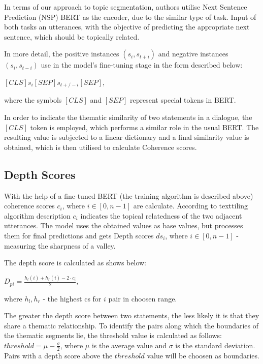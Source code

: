 \documentclass[PMI,VKR]{HSEUniversity}
\begin{document}
In terms of our approach to topic segmentation, authors utilise Next Sentence Prediction (NSP) BERT as the encoder, due to the similar type of task. 
Input of both tasks an utterances, with the objective of predicting the appropriate next sentence, which should be topically related. 

In more detail, the positive instances $(s_{i}, s_{t+i})$ and negative instances $(s_{i}, s_{t-i})$ use in the model's fine-tuning stage in the form described below: 
\begin{center}
    $[CLS] s_{i} [SEP] s_{t+/-i} [SEP]$,
\end{center}
where the symbols $[CLS]$ and $[SEP]$ represent special tokens in BERT. 

In order to indicate the thematic similarity of two statements in a dialogue, the $[CLS]$ token is employed, which performs a similar role in the usual BERT. 
The resulting value is subjected to a linear dictionary and a final similarity value is obtained, which is then utilised to calculate Coherence scores.

\subsection{Depth Scores}

With the help of a fine-tuned BERT (the training algorithm is described above) coherence scores $c_i$, where $i \in [0, n - 1]$ are calculate. According to texttiling algorithm description $c_i$ indicates the topical relatedness of the two adjacent utterances.
The model uses the obtained values as base values, but processes them for final predictions and gets Depth scores $ds_i$, where $i \in [0, n - 1]$  - measuring the sharpness of a valley.

The depth score is calculated as shows below: 
\begin{center}
    $D_{pi} = \frac{h_{l}(i) + h_{r}(i) - 2 \cdot c_{i}}{2}$,
\end{center}
where $h_{l}, h_{r}$ - the highest cs for $i$ pair in choosen range.

The greater the depth score between two statements, the less likely it is that they share a thematic relationship. 
To identify the pairs along which the boundaries of the thematic segments lie, the threshold value is calculated as follows: $threshold = \mu - \frac{\sigma}{2}$, where $\mu$ is the average value and $\sigma$ is the standard deviation. Pairs with a depth score above the $threshold$ value will be choosen as boundaries.
\end{document}
